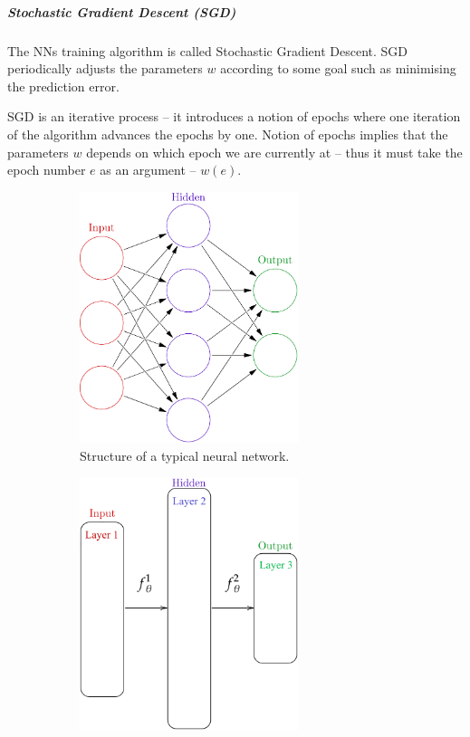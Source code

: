 \documentclass[dissertation.tex]{subfiles}
\begin{document}
\subparagraph{Stochastic Gradient Descent (SGD)} The NNs training algorithm is
called Stochastic Gradient Descent. SGD periodically adjusts the parameters $w$
according to some goal such as minimising the prediction error. 

SGD is an iterative process -- it introduces a notion of epochs where one
iteration of the algorithm advances the epochs by one. Notion of epochs implies
that the parameters $w$ depends on which epoch we are currently at -- thus it
must take the epoch number $e$ as an argument -- $w(e)$.


\begin{figure}[H]
  \centering
  \begin{subfigure}[t]{0.49\textwidth}
    \centering
    \includegraphics[width=0.7\textwidth]{figs/neural_network.png}
    \caption{
      Structure of a typical neural network.
    }
    \label{fig:nnOriginal}
  \end{subfigure}
  \hfill
  \begin{subfigure}[t]{0.49\textwidth}
    \centering
    \includegraphics[width=0.7\textwidth]{figs/neural_network_abstraction.png}

\end{subfigure}
\end{figure}
\end{document}
